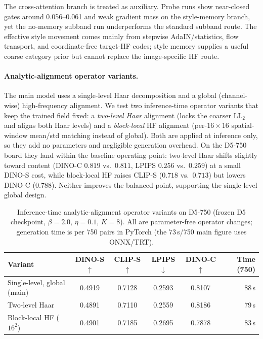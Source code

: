 \documentclass[letterpaper]{article}
\begin{document}
The cross-attention branch is treated as auxiliary. Probe runs show near-closed gates
around 0.056--0.061 and weak gradient mass on the style-memory branch, yet the no-memory
subband run underperforms the standard subband route. The effective style movement comes
mainly from stepwise AdaIN/statistics, flow transport, and coordinate-free target-HF
codes; style memory supplies a useful coarse category prior but cannot replace the
image-specific HF route.

\paragraph{Analytic-alignment operator variants.}
The main model uses a single-level Haar decomposition and a global (channel-wise)
high-frequency alignment. We test two inference-time operator variants that keep the
trained field fixed: a \emph{two-level Haar} alignment (locks the coarser $\mathrm{LL}_2$
and aligns both Haar levels) and a \emph{block-local} HF alignment (per-$16\times16$
spatial-window mean/std matching instead of global). Both are applied at inference only,
so they add no parameters and negligible generation overhead. On the D5-750 board they
land within the baseline operating point: two-level Haar shifts slightly toward content
(DINO-C $0.819$ vs.\ $0.811$, LPIPS $0.256$ vs.\ $0.259$) at a small DINO-S cost, while
block-local HF raises CLIP-S ($0.718$ vs.\ $0.713$) but lowers DINO-C ($0.788$). Neither
improves the balanced point, supporting the single-level global design.

\begin{table}[t]
\centering
\small
\setlength{\tabcolsep}{4pt}
\begin{tabular}{@{}lccccr@{}}
\toprule
Variant & DINO-S$\uparrow$ & CLIP-S$\uparrow$ & LPIPS$\downarrow$ & DINO-C$\uparrow$ & Time (750) \\
\midrule
Single-level, global (main) & 0.4919 & 0.7128 & 0.2593 & 0.8107 & 88\,s \\
Two-level Haar & 0.4891 & 0.7110 & 0.2559 & 0.8186 & 79\,s \\
Block-local HF ($16^2$) & 0.4901 & 0.7185 & 0.2695 & 0.7878 & 83\,s \\
\bottomrule
\end{tabular}
\caption{Inference-time analytic-alignment operator variants on D5-750 (frozen D5
checkpoint, $\beta{=}2.0$, $\eta{=}0.1$, $K{=}8$). All are parameter-free operator
changes; generation time is per 750 pairs in PyTorch (the 73\,s/750 main figure uses
ONNX/TRT).}
\label{tab:supp-align-variants}
\end{table}
\end{document}
